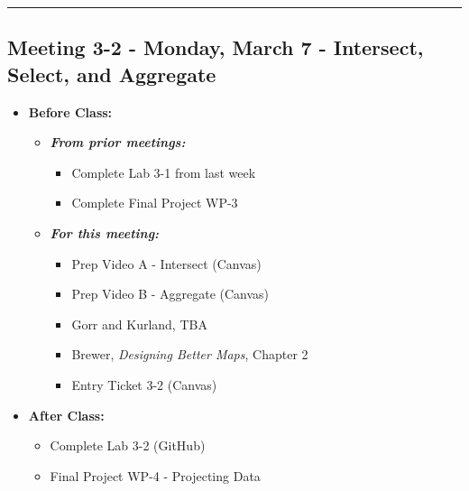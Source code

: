 \documentclass[
]{book}
\providecommand{\tightlist}{%
  \setlength{\itemsep}{0pt}\setlength{\parskip}{0pt}}
\begin{document}
\begin{center}\rule{0.5\linewidth}{0.5pt}\end{center}

\hypertarget{meeting-3-2---monday-march-7---intersect-select-and-aggregate}{%
\subsection*{Meeting 3-2 - Monday, March 7 - Intersect, Select, and Aggregate}\label{meeting-3-2---monday-march-7---intersect-select-and-aggregate}}

\begin{itemize}
\tightlist
\item
  \textbf{Before Class:}

  \begin{itemize}
  \tightlist
  \item
    \textbf{\emph{From prior meetings:}}

    \begin{itemize}
    \tightlist
    \item
      Complete Lab 3-1 from last week
    \item
      Complete Final Project WP-3
    \end{itemize}
  \item
    \textbf{\emph{For this meeting:}}

    \begin{itemize}
    \tightlist
    \item
      Prep Video A - Intersect (Canvas)
    \item
      Prep Video B - Aggregate (Canvas)
    \item
      Gorr and Kurland, TBA
    \item
      Brewer, \emph{Designing Better Maps}, Chapter 2
    \item
      Entry Ticket 3-2 (Canvas)
    \end{itemize}
  \end{itemize}
\item
  \textbf{After Class:}

  \begin{itemize}
  \tightlist
  \item
    Complete Lab 3-2 (GitHub)
  \item
    Final Project WP-4 - Projecting Data
  \end{itemize}
\end{itemize}
\end{document}

